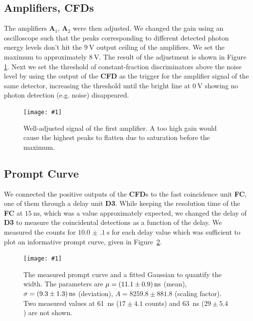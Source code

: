 \documentclass[twocolumn]{article}
\newcommand{\insertFigure}[1]{%
   \texttt{[image: \#1]}%
}
\begin{document}
\subsection{Amplifiers, CFDs}
The amplifiers \textbf{A$_1$}, \textbf{A$_2$} were then adjusted. We changed the gain using an oscilloscope such that the peaks corresponding to different detected photon energy levels don't hit the $\SI{9}{\volt}$ output ceiling of the amplifiers. We set the maximum to approximately $\SI{8}{\volt}$. The result of the adjustment is shown in Figure \ref{fig:amp}. Next we set the threshold of constant-fraction discriminators above the noise level by using the output of the \textbf{CFD} as the trigger for the amplifier signal of the same detector, increasing the threshold until the bright line at $\SI{0}{\volt}$ showing no photon detection (e.g. noise) disappeared. 
\begin{figure}[!h]
	\centering
	\insertFigure{./screenshots/SC08_cropped.png}
	\caption{Well-adjusted signal of the first amplifier. A too high gain would cause the highest peaks to flatten due to saturation before the maximum.} 
	\label{fig:amp}
\end{figure}

\subsection{Prompt Curve}
We connected the positive outputs of the \textbf{CFD}s to the fast coincidence unit \textbf{FC}, one of them through a delay unit \textbf{D3}. While keeping the resolution time of the \textbf{FC} at $\SI{15}{\nano\second}$, which was a value approximately expected, we changed the delay of \textbf{D3} to measure the coincidental detections as a function of the delay. We measured the counts for $\SI[separate-uncertainty = true]{10.0(1) }{\second}$ for each delay value which was sufficient to plot an informative prompt curve, given in Figure~\ref{fig:prompt}.
\begin{figure}[!h]
	\centering
	\insertFigure{prompt.png}
	\caption{The measured prompt curve and a fitted Gaussian to quantify the width. The parameters are $\mu = \SI[separate-uncertainty = true]{11.1 \pm 0.9}{\nano\second}$ (mean), $\sigma = \SI[separate-uncertainty = true]{9.3 \pm 1.3}{\nano\second}$ (deviation), $A = 8259.8 \pm	881.8$ (scaling factor). Two measured values at 61~ns ($17 \pm 4.1$ counts) and 63~ns ($29 \pm 5.4$) are not shown.}
	\label{fig:prompt}
\end{figure}
\end{document}
